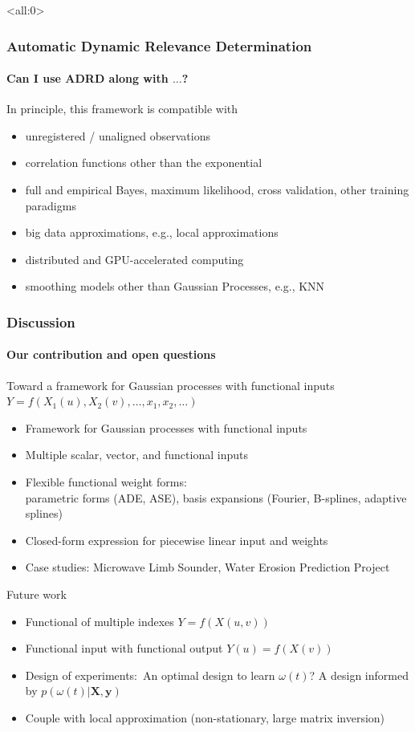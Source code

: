 \documentclass{snedecorbeamer}
\begin{document}
\begin{frame}<all:0>
  \frametitle{Automatic Dynamic Relevance Determination}
  \framesubtitle{Can I use \textsc{ADRD} along with $\dots$?}

  In principle, this framework is compatible with
  \begin{itemize}
  \item unregistered / unaligned observations
  \item correlation functions other than the exponential
  \item full and empirical Bayes, maximum likelihood, cross validation,
    other training paradigms
  \item big data approximations, e.g., local approximations
  \item distributed and GPU-accelerated computing
  \item smoothing models other than Gaussian Processes, e.g., KNN
  \end{itemize}
\end{frame}

\begin{frame}
  \frametitle{Discussion}
  \framesubtitle{Our contribution and open questions}

  Toward a framework for Gaussian processes with functional inputs
  $Y = f(X_1(u), X_2(v), \dots, x_1, x_2, \dots)$
  \begin{itemize}
    \footnotesize
  \item Framework for Gaussian processes with functional inputs
  \item Multiple scalar, vector, and functional inputs
  \item Flexible functional weight forms: \\
    parametric forms (ADE, ASE),
    basis expansions (Fourier, B-splines, adaptive splines)
  \item Closed-form expression for piecewise linear input and weights
  \item Case studies: Microwave Limb Sounder, Water Erosion Prediction Project
  \end{itemize}
  \vspace{3ex}

  Future work
  \begin{itemize}
    \footnotesize
  \item Functional of multiple indexes $Y = f(X(u, v))$
  \item Functional input with functional output $Y(u) = f(X(v))$
  \item Design of experiments:~An optimal design to learn $\omega(t)$?
    A design informed by $p(\omega(t) | \mathbf{X}, \mathbf{y})$
  \item Couple with local approximation (non-stationary, large matrix inversion)
  \end{itemize}
\end{frame}
\end{document}
